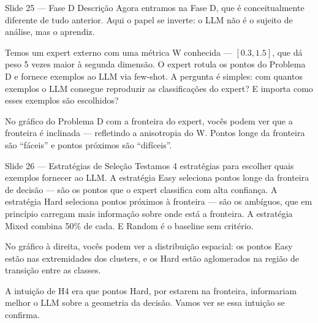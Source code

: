 \documentclass[aspectratio=169,11pt]{beamer}
\begin{document}
\begin{frame}{Slide 25 --- Fase D Descrição}
\small
Agora entramos na Fase D, que é conceitualmente diferente de tudo anterior. Aqui o papel se inverte: o LLM não é o sujeito de análise, mas o aprendiz.

Temos um expert externo com uma métrica W conhecida --- $[0.3, 1.5]$, que dá peso 5 vezes maior à segunda dimensão. O expert rotula os pontos do Problema D e fornece exemplos ao LLM via few-shot. A pergunta é simples: com quantos exemplos o LLM consegue reproduzir as classificações do expert? E importa como esses exemplos são escolhidos?

No gráfico do Problema D com a fronteira do expert, vocês podem ver que a fronteira é inclinada --- refletindo a anisotropia do W. Pontos longe da fronteira são ``fáceis'' e pontos próximos são ``difíceis''.
\end{frame}

\begin{frame}{Slide 26 --- Estratégias de Seleção}
\small
Testamos 4 estratégias para escolher quais exemplos fornecer ao LLM. A estratégia Easy seleciona pontos longe da fronteira de decisão --- são os pontos que o expert classifica com alta confiança. A estratégia Hard seleciona pontos próximos à fronteira --- são os ambíguos, que em princípio carregam mais informação sobre onde está a fronteira. A estratégia Mixed combina 50\% de cada. E Random é o baseline sem critério.

No gráfico à direita, vocês podem ver a distribuição espacial: os pontos Easy estão nas extremidades dos clusters, e os Hard estão aglomerados na região de transição entre as classes.

A intuição de H4 era que pontos Hard, por estarem na fronteira, informariam melhor o LLM sobre a geometria da decisão. Vamos ver se essa intuição se confirma.
\end{frame}
\end{document}
